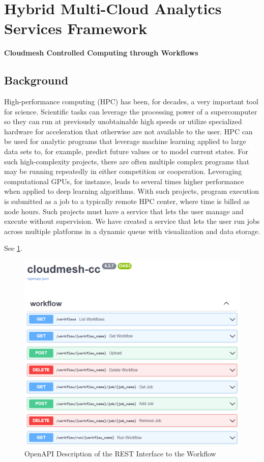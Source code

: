 \section{Hybrid Multi-Cloud Analytics Services
Framework}\label{hybrid-multi-cloud-analytics-services-framework}

\textbf{Cloudmesh Controlled Computing through Workflows}


\subsection{Background}\label{background}

High-performance computing (HPC) has been, for decades, a very important tool
for science. Scientific tasks can leverage the processing power of
a supercomputer so they can run at previously unobtainable high speeds
or utilize specialized hardware for acceleration that otherwise are not
available to the user. HPC can be used for analytic programs that
leverage machine learning applied to large data sets to, for example,
predict future values or to model current states. For such
high-complexity projects, there are often multiple complex programs that
may be running repeatedly in either competition or cooperation.
Leveraging computational GPUs, for instance, leads to several times higher
performance when applied to deep learning algorithms. With such
projects, program execution is submitted as a job to a typically remote
HPC center, where time is billed as node hours. Such projects must have
a service that lets the user manage and execute without supervision. We
have created a service that lets the user run jobs across multiple
platforms in a dynamic queue with visualization and data storage.

See \ref{fig:fastapi-service}.

\begin{figure}
\centering
\includegraphics[width=1.0\columnwidth]{images/fastapi-service.png}
\caption{OpenAPI Description of the REST Interface to the
Workflow}\label{fig:fastapi-service}
\end{figure}

